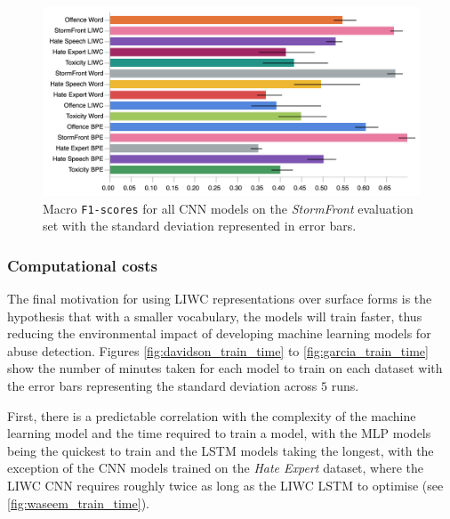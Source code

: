 \begin{figure}
    \centering
    \includegraphics[width=\textwidth]{all_cnn_garcia_test.pdf}
  \caption{Macro \texttt{F1-scores} for all CNN models on the \textit{StormFront} evaluation set with the standard deviation represented in error bars.}
  \label{fig:garcia_cnn_test}
\end{figure}

\subsubsection{Computational costs}

The final motivation for using LIWC representations over surface forms is the hypothesis that with a smaller vocabulary, the models will train faster, thus reducing the environmental impact of developing machine learning models for abuse detection. 
Figures \ref{fig:davidson_train_time} to \ref{fig:garcia_train_time} show the number of minutes taken for each model to train on each dataset with the error bars representing the standard deviation across $5$ runs.

First, there is a predictable correlation with the complexity of the machine learning model and the time required to train a model, with the MLP models being the quickest to train and the LSTM models taking the longest, with the exception of the CNN models trained on the \textit{Hate Expert} dataset, where the LIWC CNN requires roughly twice as long as the LIWC LSTM to optimise (see \cref{fig:waseem_train_time}).

